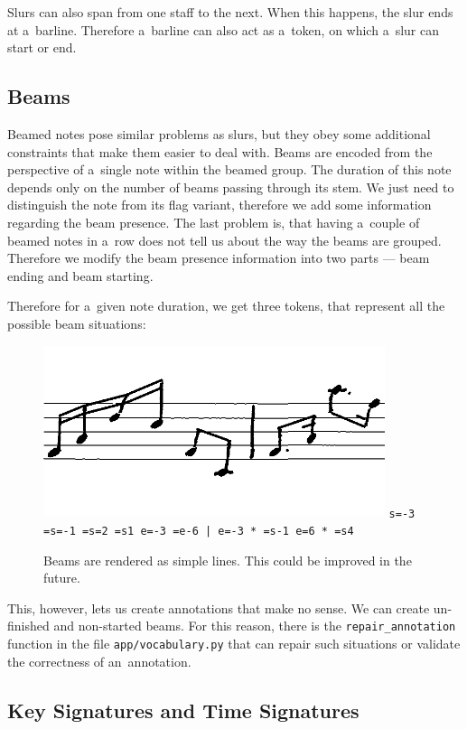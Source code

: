 Slurs can also span from one staff to the next. When this happens, the slur ends at a~barline. Therefore a~barline can also act as a~token, on which a~slur can start or end.


\subsection{Beams}

Beamed notes pose similar problems as slurs, but they obey some additional constraints that make them easier to deal with. Beams are encoded from the perspective of a~single note within the beamed group. The duration of this note depends only on the number of beams passing through its stem. We just need to distinguish the note from its flag variant, therefore we add some information regarding the beam presence. The last problem is, that having a~couple of beamed notes in a~row does not tell us about the way the beams are grouped. Therefore we modify the beam presence information into two parts --- beam ending and beam starting.

Therefore for a~given note duration, we get three tokens, that represent all the possible beam situations:

\begin{figure}[h]
    \centering
    \includegraphics[width=100mm]{../img/beams}
    \verb`s=-3 =s=-1 =s=2 =s1 e=-3 =e-6 | e=-3 * =s-1 e=6 * =s4`
    \caption{Beams are rendered as simple lines. This could be improved in the future.}
    \label{fig4:Beams}
\end{figure}

This, however, lets us create annotations that make no sense. We can create un-finished and non-started beams. For this reason, there is the \verb`repair_`\allowbreak\verb`annotation` function in the file \verb`app/vocabulary.py` that can repair such situations or validate the correctness of an~annotation.


\subsection{Key Signatures and Time Signatures}

